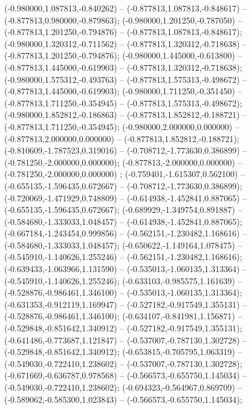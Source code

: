  (-0.980000,1.087813,-0.840262) -- (-0.877813,1.087813,-0.848617) -- (-0.877813,0.980000,-0.879863);
 (-0.980000,1.201250,-0.787050) -- (-0.877813,1.201250,-0.794876) -- (-0.877813,1.087813,-0.848617);
 (-0.980000,1.320312,-0.711562) -- (-0.877813,1.320312,-0.718638) -- (-0.877813,1.201250,-0.794876);
 (-0.980000,1.445000,-0.613800) -- (-0.877813,1.445000,-0.619903) -- (-0.877813,1.320312,-0.718638);
 (-0.980000,1.575312,-0.493763) -- (-0.877813,1.575313,-0.498672) -- (-0.877813,1.445000,-0.619903);
 (-0.980000,1.711250,-0.351450) -- (-0.877813,1.711250,-0.354945) -- (-0.877813,1.575313,-0.498672);
 (-0.980000,1.852812,-0.186863) -- (-0.877813,1.852812,-0.188721) -- (-0.877813,1.711250,-0.354945);
 (-0.980000,2.000000,0.000000) -- (-0.877813,2.000000,0.000000) -- (-0.877813,1.852812,-0.188721);
 (-0.810609,-1.787523,0.319016) -- (-0.708712,-1.773630,0.386899) -- (-0.781250,-2.000000,0.000000);
 (-0.877813,-2.000000,0.000000) -- (-0.781250,-2.000000,0.000000) ;
 (-0.759401,-1.615307,0.562100) -- (-0.655135,-1.596435,0.672667) -- (-0.708712,-1.773630,0.386899);
 (-0.720069,-1.471929,0.748809) -- (-0.614938,-1.452841,0.887065) -- (-0.655135,-1.596435,0.672667);
 (-0.689929,-1.349754,0.891887) -- (-0.584680,-1.333033,1.048457) -- (-0.614938,-1.452841,0.887065);
 (-0.667184,-1.243454,0.999856) -- (-0.562151,-1.230482,1.168616) -- (-0.584680,-1.333033,1.048457);
 (-0.650622,-1.149164,1.078475) -- (-0.545910,-1.140626,1.255246) -- (-0.562151,-1.230482,1.168616);
 (-0.639433,-1.063966,1.131590) -- (-0.535013,-1.060135,1.313364) -- (-0.545910,-1.140626,1.255246);
 (-0.633103,-0.985575,1.161639) -- (-0.528876,-0.986461,1.346100) -- (-0.535013,-1.060135,1.313364);
 (-0.631353,-0.912119,1.169947) -- (-0.527182,-0.917549,1.355131) -- (-0.528876,-0.986461,1.346100);
 (-0.634107,-0.841981,1.156871) -- (-0.529848,-0.851642,1.340912) -- (-0.527182,-0.917549,1.355131);
 (-0.641486,-0.773687,1.121847) -- (-0.537007,-0.787130,1.302728) -- (-0.529848,-0.851642,1.340912);
 (-0.653815,-0.705795,1.063319) -- (-0.549030,-0.722410,1.238602) -- (-0.537007,-0.787130,1.302728);
 (-0.671669,-0.636787,0.978568) -- (-0.566573,-0.655750,1.145034) -- (-0.549030,-0.722410,1.238602);
 (-0.694323,-0.564967,0.869709) -- (-0.589062,-0.585300,1.023843) -- (-0.566573,-0.655750,1.145034);
